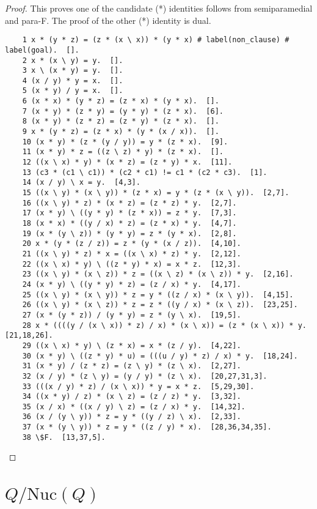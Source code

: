 \documentclass[12pt, twoside, openright]{report}
\theoremstyle{definition}
\newcommand{\rdv}{/}                %
\newcommand{\nuc}{\text{Nuc}}       %
\begin{document}
\begin{proof}\label{appendix:semipara+paraF}
  This proves one of the candidate (*) identities follows from semiparamedial and para-F. The proof of the other (*) identity is dual.
  \begin{lstlisting} 
    1 x * (y * z) = (z * (x \ x)) * (y * x) # label(non_clause) # label(goal).  [].
    2 x * (x \ y) = y.  [].
    3 x \ (x * y) = y.  [].
    4 (x / y) * y = x.  [].
    5 (x * y) / y = x.  [].
    6 (x * x) * (y * z) = (z * x) * (y * x).  [].
    7 (x * y) * (z * y) = (y * y) * (z * x).  [6].
    8 (x * y) * (z * z) = (z * y) * (z * x).  [].
    9 x * (y * z) = (z * x) * (y * (x / x)).  [].
    10 (x * y) * (z * (y / y)) = y * (z * x).  [9].
    11 (x * y) * z = ((z \ z) * y) * (z * x).  [].
    12 ((x \ x) * y) * (x * z) = (z * y) * x.  [11].
    13 (c3 * (c1 \ c1)) * (c2 * c1) != c1 * (c2 * c3).  [1].
    14 (x / y) \ x = y.  [4,3].
    15 ((x \ y) * (x \ y)) * (z * x) = y * (z * (x \ y)).  [2,7].
    16 ((x \ y) * z) * (x * z) = (z * z) * y.  [2,7].
    17 (x * y) \ ((y * y) * (z * x)) = z * y.  [7,3].
    18 (x * x) * ((y / x) * z) = (z * x) * y.  [4,7].
    19 (x * (y \ z)) * (y * y) = z * (y * x).  [2,8].
    20 x * (y * (z / z)) = z * (y * (x / z)).  [4,10].
    21 ((x \ y) * z) * x = ((x \ x) * z) * y.  [2,12].
    22 ((x \ x) * y) \ ((z * y) * x) = x * z.  [12,3].
    23 ((x \ y) * (x \ z)) * z = ((x \ z) * (x \ z)) * y.  [2,16].
    24 (x * y) \ ((y * y) * z) = (z / x) * y.  [4,17].
    25 ((x \ y) * (x \ y)) * z = y * ((z / x) * (x \ y)).  [4,15].
    26 ((x \ y) * (x \ z)) * z = z * ((y / x) * (x \ z)).  [23,25].
    27 (x * (y * z)) / (y * y) = z * (y \ x).  [19,5].
    28 x * ((((y / (x \ x)) * z) / x) * (x \ x)) = (z * (x \ x)) * y.  [21,18,26].
    29 ((x \ x) * y) \ (z * x) = x * (z / y).  [4,22].
    30 (x * y) \ ((z * y) * u) = (((u / y) * z) / x) * y.  [18,24].
    31 (x * y) / (z * z) = (z \ y) * (z \ x).  [2,27].
    32 (x / y) * (z \ y) = (y / y) * (z \ x).  [20,27,31,3].
    33 (((x / y) * z) / (x \ x)) * y = x * z.  [5,29,30].
    34 ((x * y) / z) * (x \ z) = (z / z) * y.  [3,32].
    35 (x / x) * ((x / y) \ z) = (z / x) * y.  [14,32].
    36 (x / (y \ y)) * z = y * ((y / z) \ x).  [2,33].
    37 (x * (y \ y)) * z = y * ((z / y) * x).  [28,36,34,35].
    38 \$F.  [13,37,5]. 
  \end{lstlisting}
\end{proof}


\section{$Q\rdv\nuc(Q)$}
\end{document}

